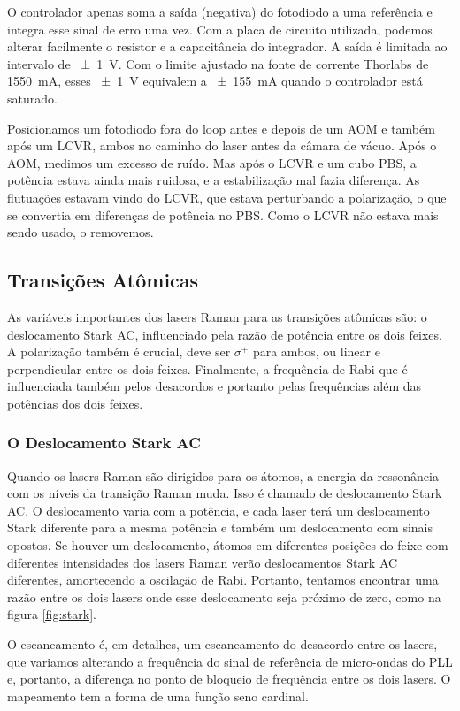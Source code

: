 O controlador apenas soma a saída (negativa) do fotodiodo a uma referência e integra esse sinal de erro uma vez. Com a placa de circuito utilizada, podemos alterar facilmente o resistor e a capacitância do integrador. A saída é limitada ao intervalo de \SI{\pm1}{V}. Com o limite ajustado na fonte de corrente Thorlabs de \SI{1550}{mA}, esses \SI{\pm1}{V} equivalem a \SI{\pm155}{mA} quando o controlador está saturado.

Posicionamos um fotodiodo fora do loop antes e depois de um \gls{AOM} e também após um \gls{LCVR}, ambos no caminho do laser antes da câmara de vácuo. Após o \gls{AOM}, medimos um excesso de ruído. Mas após o \gls{LCVR} e um cubo \gls{PBS}, a potência estava ainda mais ruidosa, e a estabilização mal fazia diferença. As flutuações estavam vindo do \gls{LCVR}, que estava perturbando a polarização, o que se convertia em diferenças de potência no \gls{PBS}. Como o \gls{LCVR} não estava mais sendo usado, o removemos.

\subsection{Transições Atômicas}
As variáveis importantes dos lasers Raman para as transições atômicas são: o deslocamento Stark AC, influenciado pela razão de potência entre os dois feixes. A polarização também é crucial, deve ser $\sigma^+$ para ambos, ou linear e perpendicular entre os dois feixes. Finalmente, a frequência de Rabi que é influenciada também pelos desacordos e portanto pelas frequências além das potências dos dois feixes.

\subsubsection{O Deslocamento Stark AC}

Quando os lasers Raman são dirigidos para os átomos, a energia da ressonância com os níveis da transição Raman muda. Isso é chamado de deslocamento Stark AC. O deslocamento varia com a potência, e cada laser terá um deslocamento Stark diferente para a mesma potência e também um deslocamento com sinais opostos. Se houver um deslocamento, átomos em diferentes posições do feixe com diferentes intensidades dos lasers Raman verão deslocamentos Stark AC diferentes, amortecendo a oscilação de Rabi. Portanto, tentamos encontrar uma razão entre os dois lasers onde esse deslocamento seja próximo de zero, como na figura \ref{fig:stark}.

O escaneamento é, em detalhes, um escaneamento do desacordo entre os lasers, que variamos alterando a frequência do sinal de referência de micro-ondas do PLL e, portanto, a diferença no ponto de bloqueio de frequência entre os dois lasers. O mapeamento tem a forma de uma função seno cardinal.

